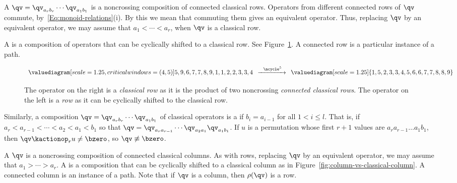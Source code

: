 A   $\qv = \qv_{a_r b_r}\dotsb\qv_{a_1 b_1}$ is a noncrossing composition of connected classical rows.
Operators from different connected rows of $\qv$ commute, by~\eqref{Eq:monoid-relations}(i).
By this we mean that commuting them gives an equivalent operator.
Thus, replacing $\qv$ by an equivalent operator, we may assume that $a_1<\dotsb<a_r$, when $\qv$ is a classical row.

A  is a composition of operators that can be cyclically shifted to a classical row.
See Figure~\ref{fig:column-vs-classical-row}. A connected row is a particular instance of a path.

\begin{figure}[htpb]
    \centering
    \begin{equation*}
        \begin{array}{c}
            \valuediagram[scale=1.25, critical windows={(4,5)}]{{5,9},{6,7},{7,8},{9,1},{1,2},{2,3},{3,4}}
        \end{array}
        \xrightarrow{~~\ncycle^5~}
        \begin{array}{c}
            \valuediagram[scale=1.25]{{1,5},{2,3},{3,4},{5,6},{6,7},{7,8},{8,9}}
        \end{array}
    \end{equation*}
    \caption{The operator on the right is a \emph{classical row} as it is the product
        of two noncrossing \emph{connected classical rows}.
        The operator on the left is a \emph{row} as it can be cyclically
    shifted to the classical row.}
    \label{fig:column-vs-classical-row}
\end{figure}

Similarly, a composition $\qv = \qv_{a_r b_r}\dotsb\qv_{a_1 b_1}$ of classical operators is a  if
$b_{i} = a_{i-1}$ for all $1 < i \leq l$.
That is, if \mbox{$a_r < a_{r-1} < \cdots < a_2 < a_1 < b_1$} so that
$\qv=\qv_{a_ra_{r-1}}\dotsb\qv_{a_2a_1}\qv_{a_1b_1}$.
If $u$ is a permutation whose first $r+1$ values are $a_ra_{r-1}\dotsc a_1b_1$, then $\qv\kactionop_r u\neq\bzero$, so $\qv\not\equiv\bzero$.


A  $\qv$ is a noncrossing composition of connected classical columns.
As with rows, replacing $\qv$ by an equivalent operator, we may assume that \mbox{$a_1>\dotsb>a_r$}.
A  is a composition that can be cyclically shifted to a classical column as
in Figure~\ref{fig:column-vs-classical-column}.
A connected column is an instance of a path.
Note that if $\qv$ is a column, then $\rho(\qv)$ is a row.

